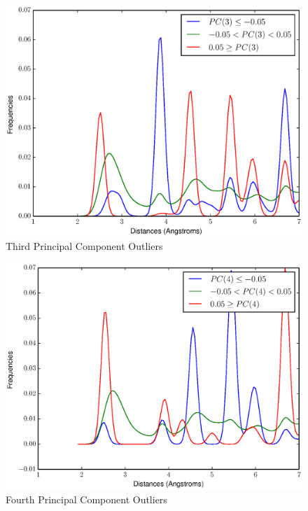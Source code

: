 \documentclass[12pt,letterpaper]{article}
\begin{document}
\begin{figure}[ht]
  \begin{center}
    \includegraphics[scale=0.8]{figs/eigenOutlier3.eps}
    \caption{Third Principal Component Outliers}
  \end{center}
\end{figure}

\begin{figure}[ht]
  \begin{center}
    \includegraphics[scale=0.8]{figs/eigenOutlier4.eps}
    \caption{Fourth Principal Component Outliers}
  \end{center}
\end{figure}
\end{document}
